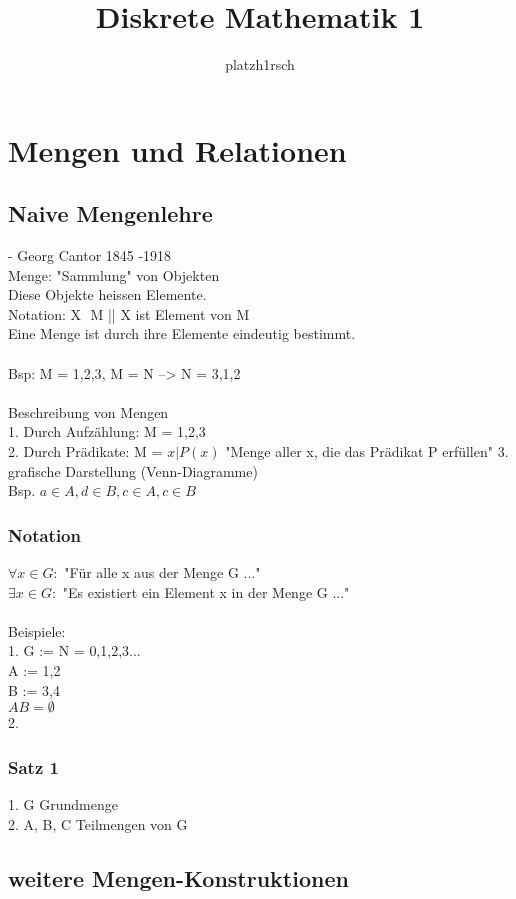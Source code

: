 \documentclass[11pt,a4paper]{article}
\author{platzh1rsch}
\title{Diskrete Mathematik 1}
\begin{document}
\section{Mengen und Relationen}
\subsection{Naive Mengenlehre}
- Georg Cantor 1845 -1918 \\
Menge: "Sammlung" von Objekten\\
Diese Objekte heissen Elemente.\\
Notation: X $  $ M || X ist Element von M\\
Eine Menge ist durch ihre Elemente eindeutig bestimmt.\\
\\
Bsp: M = {1,2,3}, M = N --> N = {3,1,2}\\
\\
Beschreibung von Mengen\\
1. Durch Aufzählung: M = { 1,2,3 }\\
2. Durch Prädikate:  M = ${x | P(x)}$  "Menge aller x, die das Prädikat P erfüllen"
3. grafische Darstellung (Venn-Diagramme)\\
Bsp. $a \in A, d \in B, c \in A, c \in B$\\

\subsubsection{Notation}
$\forall x \in G: $   "Für alle x aus der Menge G ..."\\
$\exists x \in G: $   "Es existiert ein Element x in der Menge G ..."\\\\
Beispiele:\\
1. G := N = {0,1,2,3...}\\
   A := {1,2}\\
   B := {3,4}\\
$   A B = \emptyset$\\
2. 

\subsubsection{Satz 1}
1. G Grundmenge \\
2. A, B, C Teilmengen von G \\

\subsection{weitere Mengen-Konstruktionen}
\end{document}

